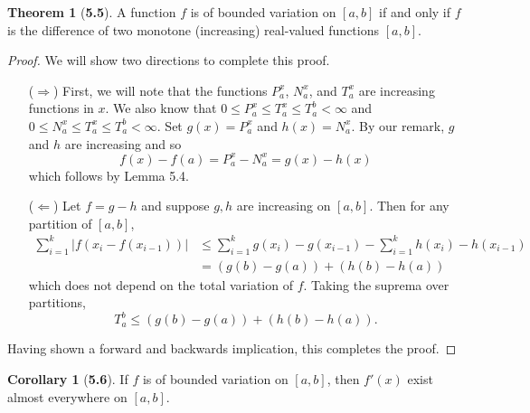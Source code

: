 \documentclass[12pt]{article}
\theoremstyle{definition}
\newtheorem*{thm}{Theorem}
\newtheorem*{cor}{Corollary}
\begin{document}
\begin{thm}[\textbf{5.5}]
    A function \( f \) is of bounded variation on \( [a,b] \) if and only if \( f \) is the difference of two monotone (increasing) real-valued functions \( [a,b] \).

        \begin{proof}
            
            We will show two directions to complete this proof.
            \begin{enumerate}
                \item[(\(\Rightarrow\))]First, we will note that the functions \( P_a^x \), \( N_a^x \), and \( T_a^x \) are increasing functions in \( x \). We also know that \( 0 \leq P_a^x \leq T_a^x \leq T_a^b < \infty \) and \( 0 \leq N_a^x \leq T_a^x \leq T_a^b < \infty \). Set \( g(x) =  P_a^x \) and \( h(x) =  N_a^x \). By our remark, \( g \) and \( h \) are increasing and so 
                \[
                    f(x) - f(a) = P_a^x - N_a^x = g(x) - h(x)   
                \]
            which follows by Lemma 5.4.
            \item[(\(\Leftarrow\))] Let \( f = g- h \) and suppose \( g, h \) are increasing on \( [a,b] \). Then for any partition of \( [a,b]\),
                \begin{align*}
                    \sum_{i=1}^{k} \left|f(x_{i} - f(x_{i-1})) \right| &\leq \sum_{i=1}^{k} g(x_i) - g(x_{i-1}) - \sum_{i=1}^{k} h(x_{i}) - h(x_{i-1}) \\
                    &= \left( g(b) - g(a) \right) + \left( h(b) - h(a)\right)
                \end{align*}
            which does not depend on the total variation of \( f \). Taking the suprema over partitions,  
                \[
                    T_a^b \leq (g(b) - g(a)) + (h(b) - h(a)).  
                \]
            \end{enumerate}
            Having shown a forward and backwards implication, this completes the proof. 
        \end{proof}

\end{thm}

\begin{cor}[\textbf{5.6}]

    If \( f \) is of bounded variation on \( [a,b] \), then \( f'(x) \) exist almost everywhere on \( [a,b] \).

\end{cor}
\end{document}

